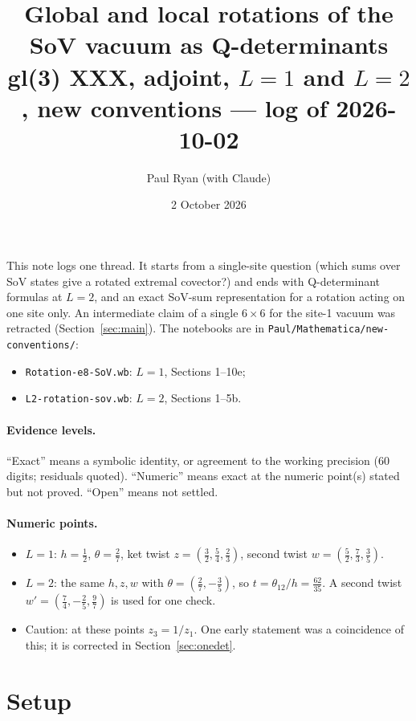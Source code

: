 \documentclass[11pt]{article}
\title{Global and local rotations of the SoV vacuum as Q-determinants\\[2pt]\large gl(3) XXX, adjoint, $L=1$ and $L=2$, new conventions --- log of 2026-10-02}
\author{Paul Ryan (with Claude)}
\date{2 October 2026}
\begin{document}
\maketitle

\noindent This note logs one thread. It starts from a single-site question (which sums over SoV states give a rotated extremal covector?) and ends with Q-determinant formulas at $L=2$, and an exact SoV-sum representation for a rotation acting on one site only. An intermediate claim of a single $6\times6$ for the site-1 vacuum was retracted (Section~\ref{sec:main}). The notebooks are in \texttt{Paul/Mathematica/new-conventions/}:
\begin{itemize}
\item \texttt{Rotation-e8-SoV.wb}: $L=1$, Sections 1--10e;
\item \texttt{L2-rotation-sov.wb}: $L=2$, Sections 1--5b.
\end{itemize}

\paragraph{Evidence levels.} ``Exact'' means a symbolic identity, or agreement to the working precision (60 digits; residuals quoted). ``Numeric'' means exact at the numeric point(s) stated but not proved. ``Open'' means not settled.

\paragraph{Numeric points.}
\begin{itemize}
\item $L=1$: $h=\tfrac12$, $\theta=\tfrac27$, ket twist $z=(\tfrac32,\tfrac54,\tfrac23)$, second twist $w=(\tfrac52,\tfrac73,\tfrac35)$.
\item $L=2$: the same $h,z,w$ with $\theta=(\tfrac27,-\tfrac35)$, so $t=\theta_{12}/h=\tfrac{62}{35}$. A second twist $w'=(\tfrac74,-\tfrac25,\tfrac97)$ is used for one check.
\item Caution: at these points $z_3=1/z_1$. One early statement was a coincidence of this; it is corrected in Section~\ref{sec:onedet}.
\end{itemize}

\tableofcontents

\section{Setup}
\end{document}
